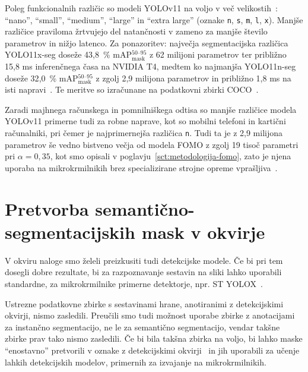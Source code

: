 \documentclass[a4paper,twoside,openright,12pt,slovene]{book}
\begin{document}
        Poleg funkcionalnih različic so modeli YOLOv11 na voljo v več velikostih~\cite{src:ultralyticsyolov11}: \enquote{nano}, \enquote{small}, \enquote{medium}, \enquote{large} in \enquote{extra large} (oznake \verb|n|, \verb|s|, \verb|m|, \verb|l|, \verb|x|).
        Manjše različice praviloma žrtvujejo del natančnosti v zameno za manjše število parametrov in nižjo latenco. Za ponazoritev: največja segmentacijska različica YOLO11x-seg doseže 43{,}8~\% mAP$^{50\text{--}95}_{\text{mask}}$ z 62 milijoni parametrov ter približno 15{,}8 ms inferenčnega časa na NVIDIA T4, medtem ko najmanjša YOLO11n-seg doseže 32{,}0~\% mAP$^{50\text{--}95}_{\text{mask}}$ z zgolj 2{,}9 milijona parametrov in približno 1{,}8 ms na isti napravi~\cite{src:ultralyticsyolov11}. Te meritve so izračunane na podatkovni zbirki COCO~\cite{src:lin2014microsoftcoco}.

        Zaradi majhnega računskega in pomnilniškega odtisa so manjše različice modela YOLOv11 primerne tudi za robne naprave, kot so mobilni telefoni in kartični računalniki, pri čemer je najprimernejša različica \texttt{n}. Tudi ta je z 2{,}9 milijona parametrov še vedno bistveno večja od modela FOMO z zgolj 19 tisoč parametri pri $\alpha=0{,}35$, kot smo opisali v poglavju~\ref{sct:metodologija-fomo}, zato je njena uporaba na mikrokrmilnikih brez specializirane strojne opreme vprašljiva~\cite{src:khanam2024yolov11}.

    \section{Pretvorba semantično-segmentacijskih mask v okvirje} \label{sct:metodologija-pretvorba}

        V okviru naloge smo želeli preizkusiti tudi detekcijske modele. Če bi pri tem dosegli dobre rezultate, bi za razpoznavanje sestavin na sliki lahko uporabili standardne, za mikrokrmilnike primerne detektorje, npr. ST YOLOX~\cite{src:ge2021yolox}.

        Ustrezne podatkovne zbirke s sestavinami hrane, anotiranimi z detekcijskimi okvirji, nismo zasledili. Preučili smo tudi možnost uporabe zbirke z anotacijami za instančno segmentacijo, ne le za semantično segmentacijo, vendar takšne zbirke prav tako nismo zasledili. Če bi bila takšna zbirka na voljo, bi lahko maske \enquote{enostavno} pretvorili v oznake z detekcijskimi okvirji~\cite{src:seychell2023efficient-mask2annotation} in jih uporabili za učenje lahkih detekcijskih modelov, primernih za izvajanje na mikrokrmilnikih.
\end{document}
